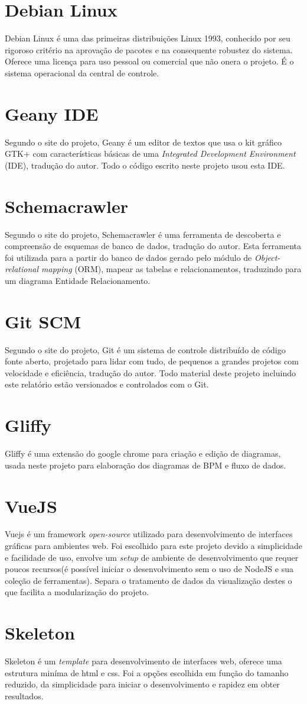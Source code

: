 \section{Debian Linux}
Debian Linux é uma das primeiras distribuições Linux 1993, conhecido por seu rigoroso critério na aprovação de pacotes e na consequente robustez do sistema. Oferece uma licença para uso pessoal ou comercial que não onera o projeto. É o sistema operacional da central de controle. \cite{Debian2017}

\section{Geany IDE}
Segundo o site do projeto, Geany é um editor de textos que usa o kit gráfico GTK+ com características básicas de uma \textit{Integrated Development Environment} (IDE), tradução do autor. Todo o código escrito neste projeto usou esta IDE. \cite{GEANY2017}

\section{Schemacrawler}
Segundo o site do projeto, Schemacrawler é uma ferramenta de descoberta e compreensão de esquemas de banco de dados, tradução do autor. Esta ferramenta foi utilizada para a partir do banco de dados gerado pelo módulo de \textit{Object-relational mapping} (ORM), mapear as tabelas e relacionamentos, traduzindo para um diagrama Entidade Relacionamento. \cite{CRAWLER}

\section{Git SCM}
Segundo o site do projeto, Git é um sistema de controle distribuído de código fonte aberto, projetado para lidar com tudo, de pequenos a grandes projetos com velocidade e eficiência, tradução do autor. Todo material deste projeto incluindo este relatório estão versionados e controlados com o Git. \cite{GIT2017}

\section{Gliffy}
Gliffy é uma extensão do google chrome para criação e edição de diagramas, usada neste projeto para elaboração dos diagramas de BPM e fluxo de dados. \cite{GLIFFY}

\section{VueJS}
Vuejs é um framework \textit{open-source} utilizado para desenvolvimento de interfaces gráficas para ambientes web. Foi escolhido para este projeto devido a simplicidade e facilidade de uso, envolve um \textit{setup} de ambiente de desenvolvimento que requer poucos recursos(é possível iniciar o desenvolvimento sem o uso de NodeJS e sua coleção de ferramentas). Separa o tratamento de dados da visualização destes o que facilita a modularização do projeto. \cite{VUEJS}

\section{Skeleton}
Skeleton é um \textit{template} para desenvolvimento de interfaces web, oferece uma estrutura miníma de html e css. Foi a opções escolhida em função do tamanho reduzido, da simplicidade para iniciar o desenvolvimento e rapidez em obter resultados. \cite{SKELETON}
